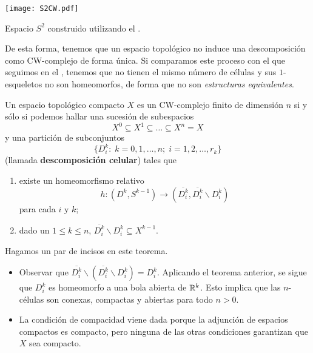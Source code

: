 \begin{marginfigure}
\texttt{[image: S2CW.pdf]}
\caption{Espacio $S^2$ construido utilizando el .}
\end{marginfigure}

De esta forma, tenemos que un espacio topológico no induce una descomposición
como CW-complejo de forma única. Si comparamos este proceso con el que
seguimos en el , tenemos que no tienen el mismo número de
células y sus $1$-esqueletos no son homeomorfos, de forma que no son
\textit{estructuras equivalentes}.

\begin{theorem}
Un espacio topológico compacto $X$ es un CW-complejo finito de dimensión $n$
si y sólo si podemos hallar una sucesión de subespacios
\[X^0 \subseteq X^1 \subseteq \dots \subseteq X^n=X\]
y una partición de subconjuntos
\[\{D_i^k:\; k=0,1,\dots,n; \;i=1,2,\dots,r_k\}\]
(llamada \textbf{descomposición celular}) tales que
\begin{enumerate}
\item existe un homeomorfismo relativo
\[h\colon (D^k,S^{k-1}) \to
(\overline{D^k_i},\overline{D^k_i}\backslash D^k_i)\]
para cada $i$ y $k$;
\item dado un $1 \leq k \leq n$, $\overline{D^k_i}\backslash D^k_i
\subseteq X^{k-1}$.
\end{enumerate}
\end{theorem}

Hagamos un par de incisos en este teorema.

\begin{itemize}
\item Observar que $\overline{D^k_i}\backslash(\overline{D^k_i}\backslash
D^k_i)=D^k_i$. Aplicando el teorema anterior, se sigue que $D^k_i$ es
homeomorfo a una bola abierta de $\mathbb{R}^k$. Esto implica que las $n$-células
son conexas, compactas y abiertas para todo $n > 0$.
\item La condición de compacidad viene dada porque la adjunción de espacios
compactos es compacto, pero ninguna de las otras condiciones garantizan que
$X$ sea compacto.
\end{itemize}

